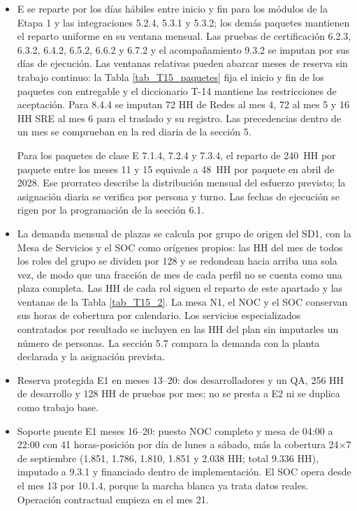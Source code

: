\begin{itemize}
\item E se reparte por los días hábiles entre inicio y fin para los módulos de la Etapa 1 y las integraciones 5.2.4, 5.3.1 y 5.3.2; los demás paquetes mantienen el reparto uniforme en su ventana mensual. Las pruebas de certificación 6.2.3, 6.3.2, 6.4.2, 6.5.2, 6.6.2 y 6.7.2 y el acompañamiento 9.3.2 se imputan por sus días de ejecución. Las ventanas relativas pueden abarcar meses de reserva sin trabajo continuo: la Tabla \ref{tab_T15_paquetes} fija el inicio y fin de los paquetes con entregable y el diccionario T-14 mantiene las restricciones de aceptación. Para 8.4.4 se imputan 72 HH de Redes al mes 4, 72 al mes 5 y 16 HH SRE al mes 6 para el traslado y su registro. Las precedencias dentro de un mes se comprueban en la red diaria de la sección 5.

Para los paquetes de clase E 7.1.4, 7.2.4 y 7.3.4, el reparto de 240~HH por paquete entre los meses 11 y 15 equivale a 48~HH por paquete en abril de 2028. Ese prorrateo describe la distribución mensual del esfuerzo previsto; la asignación diaria se verifica por persona y turno. Las fechas de ejecución se rigen por la programación de la sección 6.1.
\item La demanda mensual de plazas se calcula por grupo de origen del SD1, con la Mesa de Servicios y el SOC como orígenes propios: las HH del mes de todos los roles del grupo se dividen por 128 y se redondean hacia arriba una sola vez, de modo que una fracción de mes de cada perfil no se cuenta como una plaza completa. Las HH de cada rol siguen el reparto de este apartado y las ventanas de la Tabla \ref{tab_T15_2}. La mesa N1, el NOC y el SOC conservan sus horas de cobertura por calendario. Los servicios especializados contratados por resultado se incluyen en las HH del plan sin imputarles un número de personas. La sección 5.7 compara la demanda con la planta declarada y la asignación prevista.
\item Reserva protegida E1 en meses 13–20: dos desarrolladores y un QA, 256 HH de desarrollo y 128 HH de pruebas por mes; no se presta a E2 ni se duplica como trabajo base.
\item Soporte puente E1 meses 16–20: puesto NOC completo y mesa de 04:00 a 22:00 con 41 horas-posición por día de lunes a sábado, más la cobertura 24\ensuremath{\times}7 de septiembre (1.851, 1.786, 1.810, 1.851 y 2.038 HH; total 9.336 HH), imputado a 9.3.1 y financiado dentro de implementación. El SOC opera desde el mes 13 por 10.1.4, porque la marcha blanca ya trata datos reales. Operación contractual empieza en el mes 21.

\end{itemize}
